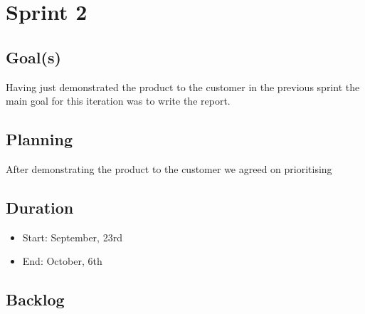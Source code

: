 

\chapter{Sprint 2}
\label{Sprint0}

\section{Goal(s)}
Having just demonstrated the product to the customer in the previous sprint the main goal
for this iteration was to write the report.


\section{Planning}

After demonstrating the product to the customer we agreed on prioritising


\section{Duration}
\begin{itemize}
\item Start: September, 23rd
\item End: October, 6th
\end{itemize}

\section{Backlog}

